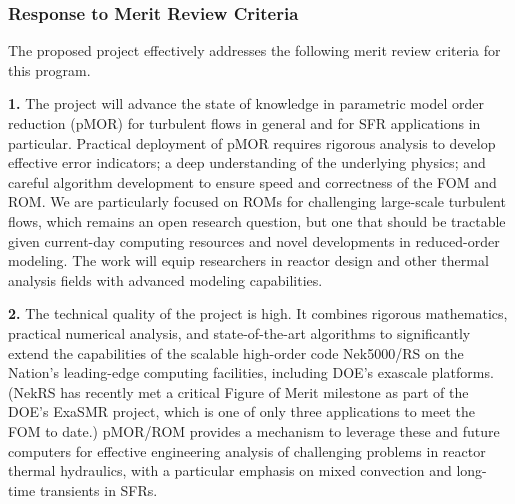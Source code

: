 




\subsubsection*{Response to Merit Review Criteria}
The proposed project effectively addresses the following merit review
criteria for this program.

\noindent \textbf{1.}
  The project will advance the state of knowledge in parametric model order
reduction (pMOR) for turbulent flows in general and for SFR applications in
particular.  Practical deployment of pMOR requires rigorous analysis to develop
effective error indicators; a deep understanding of the underlying physics; and
careful algorithm development to ensure speed and correctness of the FOM
and ROM.  We are particularly focused on ROMs for challenging large-scale
turbulent flows, which remains an open research question, but one that should
be tractable given current-day computing resources and novel developments in
reduced-order modeling.  The work will equip researchers in reactor design and
other thermal analysis fields with advanced modeling capabilities.

\noindent \textbf{2.}
The technical quality of the project is high.  It combines rigorous
mathematics, practical numerical analysis, and state-of-the-art algorithms to
significantly extend the capabilities of the scalable high-order code
Nek5000/RS on the Nation's leading-edge computing facilities, including DOE's
exascale platforms. (NekRS has recently met a critical Figure of Merit
milestone as part of the DOE's ExaSMR project, which is one of only three
applications to meet the FOM to date.)  pMOR/ROM provides a mechanism to
leverage these and future computers for effective engineering analysis of
challenging problems in reactor thermal hydraulics, with a particular 
emphasis on mixed convection and long-time transients in SFRs.

